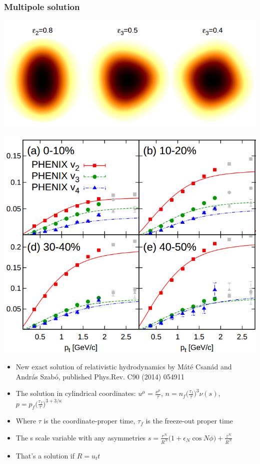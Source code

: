 \documentclass{beamer}
\begin{document}
\begin{frame}
\frametitle{Multipole solution}
  \begin{minipage}{0.39\textwidth}
    \includegraphics[scale=0.16]{pic/a1}

    \includegraphics[scale=0.2]{pic/a2}
  \end{minipage}
  \begin{minipage}{0.60\textwidth}
  \begin{itemize}
\item New exact solution of relativistic hydrodynamics by Máté Csanád and András Szabó, published Phys.Rev. C90 (2014) 054911
\item The solution in cylindrical coordinates:
$u^\mu=\frac{x^\mu}{\tau}$, $n=n_f\big(\frac{\tau_f}{\tau}\big)^3\nu(s)$, $p=p_f\big(\frac{\tau_f}{\tau}\big)^{3+3/\kappa}$
\item Where $\tau$ is the coordinate-proper time, $\tau_f$ is the freeze-out proper time
\item The s scale variable with any asymmetries 
$s=\frac{r^N}{R^N}\Big(1+\epsilon_{N}\cos N\phi\Big)+\frac{z^N}{R^N}$
\item That's a solution if $R=u_tt$
\end{itemize}
  \end{minipage}
\end{frame}
\end{document}
